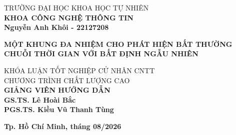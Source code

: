 \begin{titlepage}

\begin{center}

TRƯỜNG ĐẠI HỌC KHOA HỌC TỰ NHIÊN\\
\textbf{KHOA CÔNG NGHỆ THÔNG TIN}\\[2cm]


{\large \bfseries Nguyễn Anh Khôi - 22127208\\}


{ \Large \bfseries MỘT KHUNG ĐA NHIỆM CHO PHÁT HIỆN BẤT THƯỜNG CHUỖI THỜI GIAN VỚI BẤT ĐỊNH NGẪU NHIÊN\\[2cm] }


\large KHÓA LUẬN TỐT NGHIỆP CỬ NHÂN CNTT\\
\large CHƯƠNG TRÌNH CHẤT LƯỢNG CAO\\[2cm]

\textbf{GIẢNG VIÊN HƯỚNG DẪN}\\
\textbf{GS.TS. Lê Hoài Bắc}\\
\textbf{PGS.TS. Kiều Vũ Thanh Tùng}\\


\vfill
\textbf{Tp. Hồ Chí Minh, tháng 08/2026}

\end{center}
\end{titlepage}
